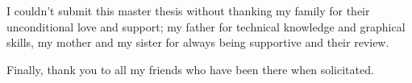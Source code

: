 I couldn't submit this master thesis without thanking my family for their unconditional love and support; my father for technical knowledge and graphical skills, my mother and my sister for always being supportive and their review.

Finally, thank you to all my friends who have been there when solicitated. 

\cleardoublepage
\tableofcontents
{}%
\cleardoublepage

\listoffigures
{}
\cleardoublepage

\cleardoublepage
\listoftables
{}
\printglossaries
\cleardoublepage
{}
\setcounter{page}{1}
\raggedbottom
